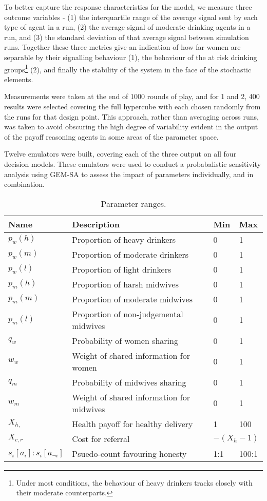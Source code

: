 To better capture the response characteristics for the model, we measure three outcome variables - (1) the interquartile range of the average signal sent by each type of agent in a run, (2) the average signal of moderate drinking agents in a run, and (3) the standard deviation of that average signal between simulation runs. Together these three metrics give an indication of how far women are separable by their signalling behaviour (1), the behaviour of the at risk drinking groups\footnote{Under most conditions, the behaviour of heavy drinkers tracks closely with their moderate counterparts.} (2), and finally the stability of the system in the face of the stochastic elements.

Measurements were taken at the end of 1000 rounds of play, and for 1 and 2, 400 results were selected covering the full hypercube with each chosen randomly from the runs for that design point. This approach, rather than averaging across runs, was taken to avoid obscuring the high degree of variability evident in the output of the payoff reasoning agents in some areas of the parameter space.

Twelve emulators were built, covering each of the three output on all four decision models. These emulators were used to conduct a probabalistic sensitivity analysis using \ac{GEM-SA} to assess the impact of parameters individually, and in combination.

\begin{table}
\center
\begin{tabular} {|l | l | l| l|}
\hline
Name & Description & Min & Max \\ \hline
\(p_{w}(h)\) & Proportion of heavy drinkers & 0 & 1 \\ \hline
\(p_{w}(m)\) & Proportion of moderate drinkers & 0 & 1 \\ \hline
\(p_{w}(l)\) & Proportion of light drinkers & 0 & 1 \\ \hline
\(p_{m}(h)\) & Proportion of harsh midwives & 0 & 1 \\ \hline
\(p_{m}(m)\) & Proportion of moderate midwives & 0 & 1 \\ \hline
\(p_{m}(l)\) & Proportion of non-judgemental midwives & 0 & 1 \\ \hline
\(q_{w}\) & Probability of women sharing & 0 & 1 \\ \hline
\(w_{w}\) & Weight of shared information for women & 0 & 1 \\ \hline
\(q_{m}\) & Probability of midwives sharing & 0 & 1 \\ \hline
\(w_{m}\) & Weight of shared information for midwives & 0 & 1 \\ \hline
\(X_{h,}\) & Health payoff for healthy delivery & 1 & 100 \\ \hline
\(X_{c, r}\) & Cost for referral & \multicolumn{2}{l|}{\(-(X_{h} - 1)\)} \\ \hline
\(s_{i}[a_{i}]:s_{i}[a_{\neg i}]\) & Psuedo-count favouring honesty & 1:1 & 100:1 \\ \hline
\end{tabular}
\caption[Table caption text]{Parameter ranges. \label{tab:sa_params}}
\end{table}

